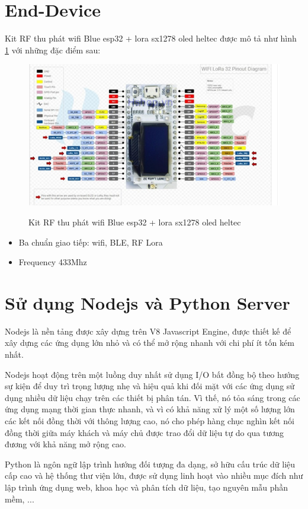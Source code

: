 \section{End-Device}
Kit RF thu phát wifi Blue esp32 + lora sx1278 oled heltec được mô tả như hình \ref{fig:lorawan_kit} với những đặc điểm sau:
\begin{figure}[H]
    \includegraphics[width=\textwidth]{images/Quanh/lora_kit.png}
    \caption{Kit RF thu phát wifi Blue esp32 + lora sx1278 oled heltec} \cite{lorawan32}
    \label{fig:lorawan_kit}
\end{figure}
\begin{itemize}
    \item Ba chuẩn giao tiếp: wifi, BLE, RF Lora
    \item Frequency 433Mhz
\end{itemize}

\section{Sử dụng Nodejs và Python Server}
Nodejs là nền tảng được xây dựng trên V8 Javascript Engine, được thiết kế để xây dựng các ứng dụng lớn nhỏ và có thể mở rộng nhanh với chi phí ít tốn kém nhất.

Nodejs hoạt động trên một luồng duy nhất sử dụng I/O bất đồng bộ theo hướng sự kiện để duy trì trọng lượng nhẹ và hiệu quả khi đối mặt với các ứng dụng sử dụng nhiều dữ liệu chạy trên các thiết bị phân tán. Vì thế, nó tỏa sáng trong các ứng dụng mạng thời gian thực nhanh, và vì có khả năng xử lý một số lượng lớn các kết nối đồng thời với thông lượng cao, nó cho phép hàng chục nghìn kết nối đồng thời giữa máy khách và máy chủ được trao đổi dữ liệu tự do qua tương đương với khả năng mở rộng cao.

Python là ngôn ngữ lập trình hướng đối tượng đa dạng, sở hữu cấu trúc dữ liệu cấp cao và hệ thống thư viện lớn, được sử dụng linh hoạt vào nhiều mục đích như lập trình ứng dụng web, khoa học và phân tích dữ liệu, tạo nguyên mẫu phần mềm, ...

